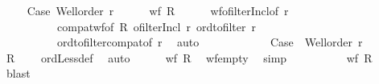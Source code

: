 \begin{isabellebody}
\ \ \ \isacommand{{\isacharbraceleft}{\kern0pt}}\isamarkupfalse%
\isamarkupfalse%
\ Case{}{\isacharcolon}{\kern0pt}\ {\isachardoublequoteopen}Well{\isacharunderscore}{\kern0pt}order\ r{}{\isachardoublequoteclose}\isanewline
\ \ \ \ \isamarkupfalse%
\ {\isachardoublequoteopen}wf\ {\isacharquery}{\kern0pt}R{\isachardoublequoteclose}\isanewline
\ \ \ \ \isamarkupfalse%
\ wf{\isacharunderscore}{\kern0pt}ofilterIncl{\isacharbrackleft}{\kern0pt}of\ r{}{\isacharbrackright}{\kern0pt}\isanewline
\ \ \ \ \ \ \ \ \ \ compat{\isacharunderscore}{\kern0pt}wf{\isacharbrackleft}{\kern0pt}of\ {\isacharquery}{\kern0pt}R\ {\isachardoublequoteopen}ofilterIncl\ r{}{\isachardoublequoteclose}\ {\isachardoublequoteopen}ord{\isacharunderscore}{\kern0pt}to{\isacharunderscore}{\kern0pt}filter\ r{}{\isachardoublequoteclose}{\isacharbrackright}{\kern0pt}\isanewline
\ \ \ \ \ \ \ \ \ \ ord{\isacharunderscore}{\kern0pt}to{\isacharunderscore}{\kern0pt}filter{\isacharunderscore}{\kern0pt}compat{\isacharbrackleft}{\kern0pt}of\ r{}{\isacharbrackright}{\kern0pt}\ \isamarkupfalse%
\ auto\isanewline
\ \ \ \isacommand{{\isacharbraceright}{\kern0pt}}\isamarkupfalse%
\isanewline
\ \ \ \isamarkupfalse%
\isanewline
\ \ \ \isacommand{{\isacharbraceleft}{\kern0pt}}\isamarkupfalse%
\isamarkupfalse%
\ Case{}{\isacharcolon}{\kern0pt}\ {\isachardoublequoteopen}{\isasymnot}\ Well{\isacharunderscore}{\kern0pt}order\ r{}{\isachardoublequoteclose}\isanewline
\ \ \ \ \isamarkupfalse%
\ {\isachardoublequoteopen}{\isacharquery}{\kern0pt}R\ {\isacharequal}{\kern0pt}\ {\isacharbraceleft}{\kern0pt}{\isacharbraceright}{\kern0pt}{\isachardoublequoteclose}\ \isamarkupfalse%
\ ordLess{\isacharunderscore}{\kern0pt}def\ \isamarkupfalse%
\ auto\isanewline
\ \ \ \ \isamarkupfalse%
\ {\isachardoublequoteopen}wf\ {\isacharquery}{\kern0pt}R{\isachardoublequoteclose}\ \isamarkupfalse%
\ wf{\isacharunderscore}{\kern0pt}empty\ \isamarkupfalse%
\ simp\isanewline
\ \ \ \isacommand{{\isacharbraceright}{\kern0pt}}\isamarkupfalse%
\isanewline
\ \ \ \isamarkupfalse%
\ \isamarkupfalse%
\ {\isachardoublequoteopen}wf\ {\isacharquery}{\kern0pt}R{\isachardoublequoteclose}\ \isamarkupfalse%
\ blast\isanewline
\ \ \isacommand{{\isacharbraceright}{\kern0pt}}\isamarkupfalse%
\isanewline

\end{isabellebody}

